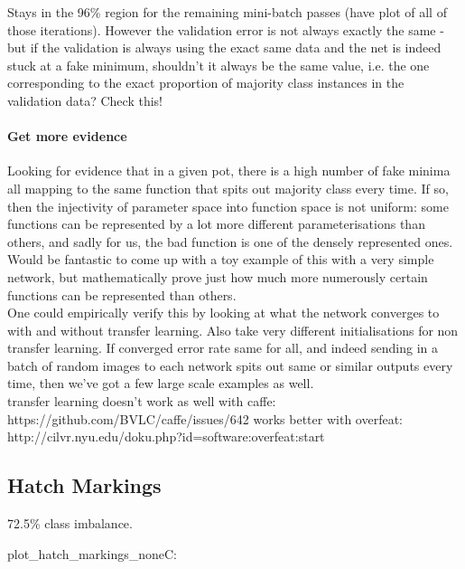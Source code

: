 \documentclass[a4paper,11pt]{article}
\begin{document}
Stays in the 96\% region for the remaining mini-batch passes (have plot of all of those iterations). However the validation error is not always exactly the same - but if the validation is always using the exact same data and the net is indeed stuck at a fake minimum, shouldn't it always be the same value, i.e. the one corresponding to the exact proportion of majority class instances in the validation data? Check this!\\


\paragraph{Get more evidence}

Looking for evidence that in a given pot, there is a high number of fake minima all mapping to the same function that spits out majority class every time. If so, then the injectivity of parameter space into function space is not uniform: some functions can be represented by a lot more different parameterisations than others, and sadly for us, the bad function is one of the densely represented ones. Would be fantastic to come up with a toy example of this with a very simple network, but mathematically prove just how much more numerously certain functions can be represented than others. \\

One could empirically verify this by looking at what the network converges to with and without transfer learning. Also take very different initialisations for non transfer learning. If converged error rate same for all, and indeed sending in a batch of random images to each network spits out same or similar outputs every time, then we've got a few large scale examples as well. \\

transfer learning doesn't work as well with caffe:
https://github.com/BVLC/caffe/issues/642
works better with overfeat: http://cilvr.nyu.edu/doku.php?id=software:overfeat:start


\subsection{Hatch Markings}

72.5\% class imbalance. 

plot_hatch_markings_noneC:
\end{document}
